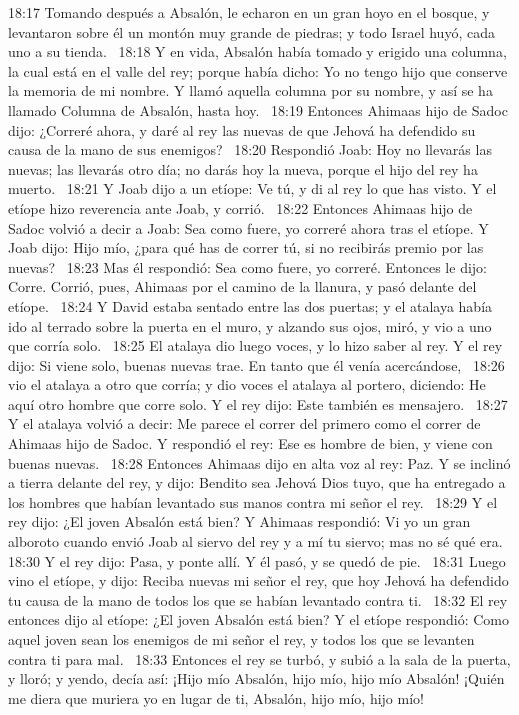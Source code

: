 18:17 Tomando después a Absalón, le echaron en un gran hoyo en el bosque, y levantaron sobre él un montón muy grande de piedras; y todo Israel huyó, cada uno a su tienda.  
18:18 Y en vida, Absalón había tomado y erigido una columna, la cual está en el valle del rey; porque había dicho: Yo no tengo hijo que conserve la memoria de mi nombre. Y llamó aquella columna por su nombre, y así se ha llamado Columna de Absalón, hasta hoy.  
18:19 Entonces Ahimaas hijo de Sadoc dijo: ¿Correré ahora, y daré al rey las nuevas de que Jehová ha defendido su causa de la mano de sus enemigos?  
18:20 Respondió Joab: Hoy no llevarás las nuevas; las llevarás otro día; no darás hoy la nueva, porque el hijo del rey ha muerto.  
18:21 Y Joab dijo a un etíope: Ve tú, y di al rey lo que has visto. Y el etíope hizo reverencia ante Joab, y corrió.  
18:22 Entonces Ahimaas hijo de Sadoc volvió a decir a Joab: Sea como fuere, yo correré ahora tras el etíope. Y Joab dijo: Hijo mío, ¿para qué has de correr tú, si no recibirás premio por las nuevas?  
18:23 Mas él respondió: Sea como fuere, yo correré. Entonces le dijo: Corre. Corrió, pues, Ahimaas por el camino de la llanura, y pasó delante del etíope.  
18:24 Y David estaba sentado entre las dos puertas; y el atalaya había ido al terrado sobre la puerta en el muro, y alzando sus ojos, miró, y vio a uno que corría solo.  
18:25 El atalaya dio luego voces, y lo hizo saber al rey. Y el rey dijo: Si viene solo, buenas nuevas trae. En tanto que él venía acercándose,  
18:26 vio el atalaya a otro que corría; y dio voces el atalaya al portero, diciendo: He aquí otro hombre que corre solo. Y el rey dijo: Este también es mensajero.  
18:27 Y el atalaya volvió a decir: Me parece el correr del primero como el correr de Ahimaas hijo de Sadoc. Y respondió el rey: Ese es hombre de bien, y viene con buenas nuevas.  
18:28 Entonces Ahimaas dijo en alta voz al rey: Paz. Y se inclinó a tierra delante del rey, y dijo: Bendito sea Jehová Dios tuyo, que ha entregado a los hombres que habían levantado sus manos contra mi señor el rey.  
18:29 Y el rey dijo: ¿El joven Absalón está bien? Y Ahimaas respondió: Vi yo un gran alboroto cuando envió Joab al siervo del rey y a mí tu siervo; mas no sé qué era.  
18:30 Y el rey dijo: Pasa, y ponte allí. Y él pasó, y se quedó de pie.  
18:31 Luego vino el etíope, y dijo: Reciba nuevas mi señor el rey, que hoy Jehová ha defendido tu causa de la mano de todos los que se habían levantado contra ti.  
18:32 El rey entonces dijo al etíope: ¿El joven Absalón está bien? Y el etíope respondió: Como aquel joven sean los enemigos de mi señor el rey, y todos los que se levanten contra ti para mal.  
18:33 Entonces el rey se turbó, y subió a la sala de la puerta, y lloró; y yendo, decía así: ¡Hijo mío Absalón, hijo mío, hijo mío Absalón! ¡Quién me diera que muriera yo en lugar de ti, Absalón, hijo mío, hijo mío! 
